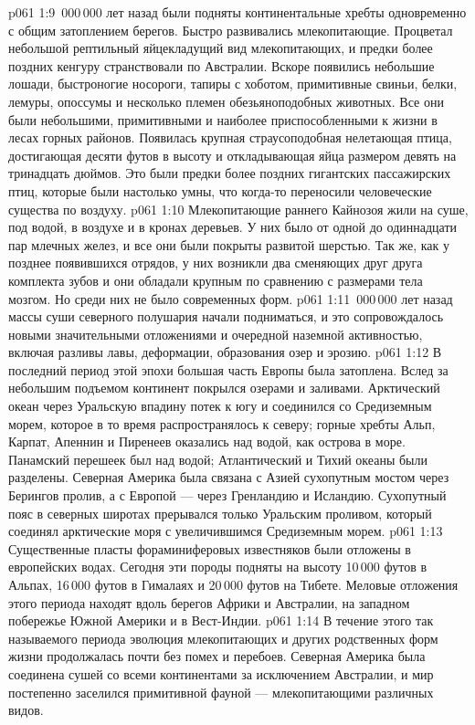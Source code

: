 \vs p061 1:9 \,000\,000 лет назад были подняты континентальные хребты одновременно с общим затоплением берегов. Быстро развивались млекопитающие. Процветал небольшой рептильный яйцекладущий вид млекопитающих, и предки более поздних кенгуру странствовали по Австралии. Вскоре появились небольшие лошади, быстроногие носороги, тапиры с хоботом, примитивные свиньи, белки, лемуры, опоссумы и несколько племен обезьяноподобных животных. Все они были небольшими, примитивными и наиболее приспособленными к жизни в лесах горных районов. Появилась крупная страусоподобная нелетающая птица, достигающая десяти футов в высоту и откладывающая яйца размером девять на тринадцать дюймов. Это были предки более поздних гигантских пассажирских птиц, которые были настолько умны, что когда\hyp{}то переносили человеческие существа по воздуху.
\vs p061 1:10 Млекопитающие раннего Кайнозоя жили на суше, под водой, в воздухе и в кронах деревьев. У них было от одной до одиннадцати пар млечных желез, и все они были покрыты развитой шерстью. Так же, как у позднее появившихся отрядов, у них возникли два сменяющих друг друга комплекта зубов и они обладали крупным по сравнению с размерами тела мозгом. Но среди них не было современных форм.
\vs p061 1:11 \,000\,000 лет назад массы суши северного полушария начали подниматься, и это сопровождалось новыми значительными отложениями и очередной наземной активностью, включая разливы лавы, деформации, образования озер и эрозию.
\vs p061 1:12 В последний период этой эпохи большая часть Европы была затоплена. Вслед за небольшим подъемом континент покрылся озерами и заливами. Арктический океан через Уральскую впадину потек к югу и соединился со Средиземным морем, которое в то время распространялось к северу; горные хребты Альп, Карпат, Апеннин и Пиренеев оказались над водой, как острова в море. Панамский перешеек был над водой; Атлантический и Тихий океаны были разделены. Северная Америка была связана с Азией сухопутным мостом через Берингов пролив, а с Европой --- через Гренландию и Исландию. Сухопутный пояс в северных широтах прерывался только Уральским проливом, который соединял арктические моря с увеличившимся Средиземным морем.
\vs p061 1:13 Существенные пласты фораминиферовых известняков были отложены в европейских водах. Сегодня эти породы подняты на высоту 10\,000 футов в Альпах, 16\,000 футов в Гималаях и 20\,000 футов на Тибете. Меловые отложения этого периода находят вдоль берегов Африки и Австралии, на западном побережье Южной Америки и в Вест\hyp{}Индии.
\vs p061 1:14 \pc В течение этого так называемого  периода эволюция млекопитающих и других родственных форм жизни продолжалась почти без помех и перебоев. Северная Америка была соединена сушей со всеми континентами за исключением Австралии, и мир постепенно заселился примитивной фауной --- млекопитающими различных видов.
